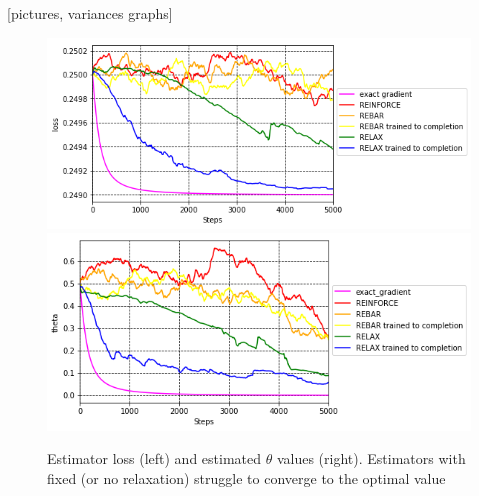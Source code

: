 \documentclass{article}
\begin{document}
[pictures, variances graphs]
\begin{figure}
\begin{center}
\includegraphics[scale=.33]{figures/losses}
\includegraphics[scale=.33]{figures/theta}
\end{center}
\label{fig:toy_loss}
\caption{Estimator loss (left) and estimated $\theta$ values (right). Estimators with fixed (or no relaxation) struggle to converge to the optimal value}
\end{figure}
\end{document}
